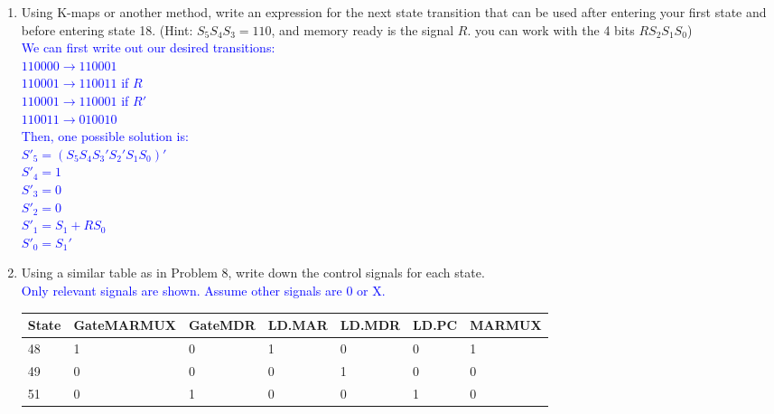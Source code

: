 \documentclass{article}
\begin{document}
\begin{enumerate}[label=(\alph*),itemsep = 20pt]
        \newpage
        \item Using K-maps or another method, write an expression for the next state transition that can be used after entering your first state and before entering state 18. (Hint: $S_5S_4S_3 = 110$, and memory ready is the signal $R$. you can work with the 4 bits $RS_2S_1S_0$) \\
        \textcolor{blue}{
        We can first write out our desired transitions: \\
        $110000 \longrightarrow 110001$ \\
        $110001 \longrightarrow 110011$ if $R$ \\
        $110001 \longrightarrow 110001$ if $R'$ \\
        $110011 \longrightarrow 010010$ \\
        Then, one possible solution is: \\
        $S'_5 = (S_5S_4S_3'S_2'S_1S_0)'$ \\
        $S'_4 = 1$ \\
        $S'_3 = 0$ \\
        $S'_2 = 0$ \\
        $S'_1 = S_1 + RS_0$ \\
        $S'_0 = S_1'$ \\ 
        }
        \item Using a similar table as in Problem 8, write down the control signals for each state. \\
        \textcolor{blue}{Only relevant signals are shown. Assume other signals are 0 or X.}
\begin{table}[!h]
\begin{tabular}{|l|l|l|l|l|l|l|}
\hline
\textbf{State} & \textbf{GateMARMUX} & \textbf{GateMDR} & \textbf{LD.MAR} & \textbf{LD.MDR} & \textbf{LD.PC} & \textbf{MARMUX} \\ \hline
48             & 1                   & 0                & 1               & 0               & 0              & 1               \\ \hline
49             & 0                   & 0                & 0               & 1               & 0              & 0               \\ \hline
51             & 0                   & 1                & 0               & 0               & 1              & 0               \\ \hline
\end{tabular}
\end{table}
\begin{table}[!h]

\end{table}
\end{enumerate}
\end{document}
